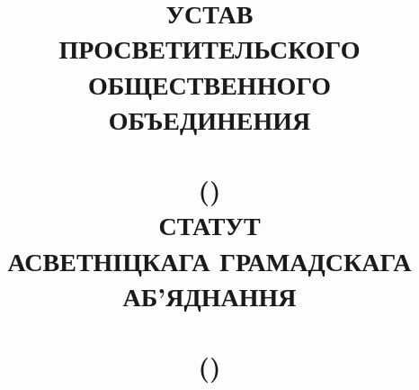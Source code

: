 
\title{\Large%
УСТАВ\\%
\textbf{\large ПРОСВЕТИТЕЛЬСКОГО ОБЩЕСТВЕННОГО ОБЪЕДИНЕНИЯ}\\%
\RuName\\[1ex]%
(\XC)\\[4ex]%
СТАТУТ\\%
\textbf{\large АСВЕТНІЦКАГА ГРАМАДСКАГА АБ’ЯДНАННЯ}\\%
\ByName\\[1ex]%
(\ByShort)%
}

\maketitle
